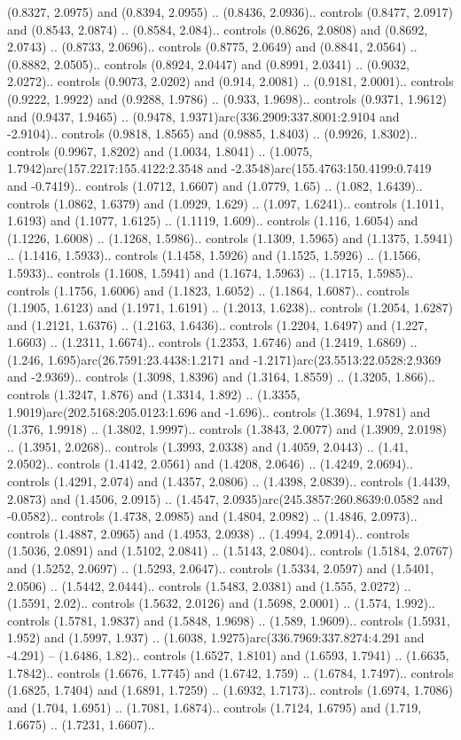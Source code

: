 (0.8327, 2.0975) and (0.8394, 2.0955) .. (0.8436, 2.0936).. controls (0.8477, 2.0917) and (0.8543, 2.0874) .. (0.8584, 2.084).. controls (0.8626, 2.0808) and (0.8692, 2.0743) .. (0.8733, 2.0696).. controls (0.8775, 2.0649) and (0.8841, 2.0564) .. (0.8882, 2.0505).. controls (0.8924, 2.0447) and (0.8991, 2.0341) .. (0.9032, 2.0272).. controls (0.9073, 2.0202) and (0.914, 2.0081) .. (0.9181, 2.0001).. controls (0.9222, 1.9922) and (0.9288, 1.9786) .. (0.933, 1.9698).. controls (0.9371, 1.9612) and (0.9437, 1.9465) .. (0.9478, 1.9371)arc(336.2909:337.8001:2.9104 and -2.9104).. controls (0.9818, 1.8565) and (0.9885, 1.8403) .. (0.9926, 1.8302).. controls (0.9967, 1.8202) and (1.0034, 1.8041) .. (1.0075, 1.7942)arc(157.2217:155.4122:2.3548 and -2.3548)arc(155.4763:150.4199:0.7419 and -0.7419).. controls (1.0712, 1.6607) and (1.0779, 1.65) .. (1.082, 1.6439).. controls (1.0862, 1.6379) and (1.0929, 1.629) .. (1.097, 1.6241).. controls (1.1011, 1.6193) and (1.1077, 1.6125) .. (1.1119, 1.609).. controls (1.116, 1.6054) and (1.1226, 1.6008) .. (1.1268, 1.5986).. controls (1.1309, 1.5965) and (1.1375, 1.5941) .. (1.1416, 1.5933).. controls (1.1458, 1.5926) and (1.1525, 1.5926) .. (1.1566, 1.5933).. controls (1.1608, 1.5941) and (1.1674, 1.5963) .. (1.1715, 1.5985).. controls (1.1756, 1.6006) and (1.1823, 1.6052) .. (1.1864, 1.6087).. controls (1.1905, 1.6123) and (1.1971, 1.6191) .. (1.2013, 1.6238).. controls (1.2054, 1.6287) and (1.2121, 1.6376) .. (1.2163, 1.6436).. controls (1.2204, 1.6497) and (1.227, 1.6603) .. (1.2311, 1.6674).. controls (1.2353, 1.6746) and (1.2419, 1.6869) .. (1.246, 1.695)arc(26.7591:23.4438:1.2171 and -1.2171)arc(23.5513:22.0528:2.9369 and -2.9369).. controls (1.3098, 1.8396) and (1.3164, 1.8559) .. (1.3205, 1.866).. controls (1.3247, 1.876) and (1.3314, 1.892) .. (1.3355, 1.9019)arc(202.5168:205.0123:1.696 and -1.696).. controls (1.3694, 1.9781) and (1.376, 1.9918) .. (1.3802, 1.9997).. controls (1.3843, 2.0077) and (1.3909, 2.0198) .. (1.3951, 2.0268).. controls (1.3993, 2.0338) and (1.4059, 2.0443) .. (1.41, 2.0502).. controls (1.4142, 2.0561) and (1.4208, 2.0646) .. (1.4249, 2.0694).. controls (1.4291, 2.074) and (1.4357, 2.0806) .. (1.4398, 2.0839).. controls (1.4439, 2.0873) and (1.4506, 2.0915) .. (1.4547, 2.0935)arc(245.3857:260.8639:0.0582 and -0.0582).. controls (1.4738, 2.0985) and (1.4804, 2.0982) .. (1.4846, 2.0973).. controls (1.4887, 2.0965) and (1.4953, 2.0938) .. (1.4994, 2.0914).. controls (1.5036, 2.0891) and (1.5102, 2.0841) .. (1.5143, 2.0804).. controls (1.5184, 2.0767) and (1.5252, 2.0697) .. (1.5293, 2.0647).. controls (1.5334, 2.0597) and (1.5401, 2.0506) .. (1.5442, 2.0444).. controls (1.5483, 2.0381) and (1.555, 2.0272) .. (1.5591, 2.02).. controls (1.5632, 2.0126) and (1.5698, 2.0001) .. (1.574, 1.992).. controls (1.5781, 1.9837) and (1.5848, 1.9698) .. (1.589, 1.9609).. controls (1.5931, 1.952) and (1.5997, 1.937) .. (1.6038, 1.9275)arc(336.7969:337.8274:4.291 and -4.291) -- (1.6486, 1.82).. controls (1.6527, 1.8101) and (1.6593, 1.7941) .. (1.6635, 1.7842).. controls (1.6676, 1.7745) and (1.6742, 1.759) .. (1.6784, 1.7497).. controls (1.6825, 1.7404) and (1.6891, 1.7259) .. (1.6932, 1.7173).. controls (1.6974, 1.7086) and (1.704, 1.6951) .. (1.7081, 1.6874).. controls (1.7124, 1.6795) and (1.719, 1.6675) .. (1.7231, 1.6607).. 